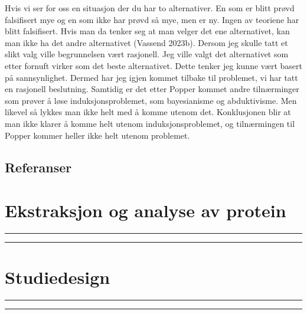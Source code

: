 \documentclass[
  letterpaper,
  DIV=11,
  numbers=noendperiod]{scrreprt}
\begin{document}
Hvis vi ser for oss en situasjon der du har to alternativer. En som er
blitt prøvd falsifisert mye og en som ikke har prøvd så mye, men er ny.
Ingen av teoriene har blitt falsifisert. Hvis man da tenker seg at man
velger det ene alternativet, kan man ikke ha det andre alternativet
(Vassend 2023b). Dersom jeg skulle tatt et slikt valg ville begrunnelsen
vært rasjonell. Jeg ville valgt det alternativet som etter fornuft
virker som det beste alternativet. Dette tenker jeg kunne vært basert på
sannsynlighet. Dermed har jeg igjen kommet tilbake til problemet, vi har
tatt en rasjonell beslutning. Samtidig er det etter Popper kommet andre
tilnærminger som prøver å løse induksjonsproblemet, som bayesianisme og
abduktivisme. Men likevel så lykkes man ikke helt med å komme utenom
det. Konklusjonen blir at man ikke klarer å komme helt utenom
induksjonsproblemet, og tilnærmingen til Popper kommer heller ikke helt
utenom problemet.

\hypertarget{referanser}{%
\section{Referanser}\label{referanser}}


\hypertarget{ekstraksjon-og-analyse-av-protein}{%
\chapter{Ekstraksjon og analyse av
protein}\label{ekstraksjon-og-analyse-av-protein}}

\begin{center}\rule{0.5\linewidth}{0.5pt}\end{center}

\begin{center}\rule{0.5\linewidth}{0.5pt}\end{center}


\hypertarget{studiedesign}{%
\chapter{Studiedesign}\label{studiedesign}}

\begin{center}\rule{0.5\linewidth}{0.5pt}\end{center}

\begin{center}\rule{0.5\linewidth}{0.5pt}\end{center}
\end{document}
